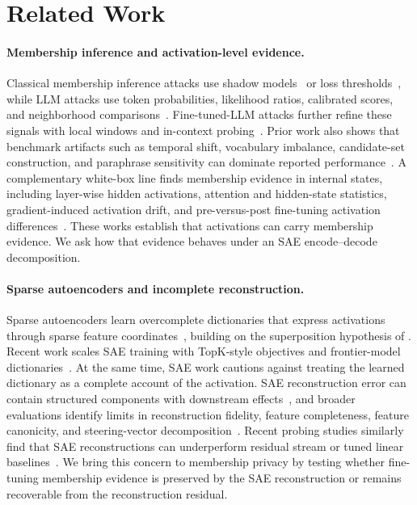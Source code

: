 \section{Related Work}
\label{sec:related}

\paragraph{Membership inference and activation-level evidence.}
Classical membership inference attacks use shadow models~\citep{shokri2017membership} or loss thresholds~\citep{yeom2018privacy}, while LLM attacks use token probabilities, likelihood ratios, calibrated scores, and neighborhood comparisons~\citep{carlini2021extracting,shi2023detecting,zhang2025minkpp,ye2022enhanced,mattern2023membership,mireshghallah2022quantifying}. Fine-tuned-LLM attacks further refine these signals with local windows and in-context probing~\citep{chen2026wbc,lu2026icp}. Prior work also shows that benchmark artifacts such as temporal shift, vocabulary imbalance, candidate-set construction, and paraphrase sensitivity can dominate reported performance~\citep{duan2024membership,meeus2025sok}. A complementary white-box line finds membership evidence in internal states, including layer-wise hidden activations, attention and hidden-state statistics, gradient-induced activation drift, and pre-versus-post fine-tuning activation differences~\citep{galli2024lumia,ferrando2026memtrace,huang2026gdrift,minder2025narrow}. These works establish that activations can carry membership evidence. We ask how that evidence behaves under an SAE encode--decode decomposition.

\paragraph{Sparse autoencoders and incomplete reconstruction.}
Sparse autoencoders learn overcomplete dictionaries that express activations through sparse feature coordinates~\citep{cunningham2024sae,bricken2023monosemanticity}, building on the superposition hypothesis of \citet{elhage2022toy}. Recent work scales SAE training with TopK-style objectives and frontier-model dictionaries~\citep{gao2025scaling,templeton2024scaling}. At the same time, SAE work cautions against treating the learned dictionary as a complete account of the activation. SAE reconstruction error can contain structured components with downstream effects~\citep{engels2024dark}, and broader evaluations identify limits in reconstruction fidelity, feature completeness, feature canonicity, and steering-vector decomposition~\citep{karvonen2025saebench,leask2025sparse,mayne2024steering,sharkey2025open,peng2025discover}. Recent probing studies similarly find that SAE reconstructions can underperform residual stream or tuned linear baselines~\citep{smith2025deepmind,kantamneni2025sparse,davis2026probes}. We bring this concern to membership privacy by testing whether fine-tuning membership evidence is preserved by the SAE reconstruction or remains recoverable from the reconstruction residual.

